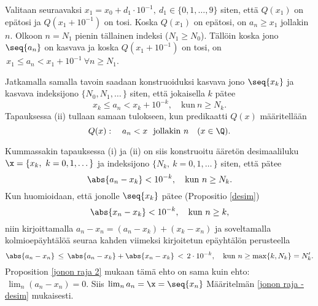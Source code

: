 Valitaan seuraavaksi $x_1 = x_0 + d_1 \cdot 10^{-1},\ d_1 \in \{0,1, \ldots, 9\}$ siten, että
$Q(x_1)$ on epätosi ja $Q(x_1 + 10^{-1})$ on tosi. Koska $Q(x_1)$ on epätosi, on $a_n \ge x_1$
jollakin $n$. Olkoon $n=N_1$ pienin tällainen indeksi ($N_1 \ge N_0$). Tällöin koska jono 
$\seq{a_n}$ on kasvava ja koska $Q(x_1 + 10^{-1})$ on tosi, on 
$\,x_1 \le a_n < x_1 + 10^{-1}\ \forall n \ge N_1$.

Jatkamalla samalla tavoin saadaan konstruoiduksi kasvava jono $\seq{x_k}$ ja kasvava indeksijono
$\{N_0,N_1, \ldots\,\}$ siten, että jokaisella $k$ pätee
\begin{equation}  \label{suppenemisehto - desim}
x_k \le a_n < x_k + 10^{-k}, \quad \text{kun}\ n \ge N_k. \tag{$\star$}
\end{equation}
Tapauksessa (ii) tullaan samaan tulokseen, kun predikaatti $Q(x)$ määritellään
\[
Q(x): \quad a_n < x \ \ \text{jollakin}\ n \quad (x \in \Q).
\]

Kummassakin tapauksessa (i) ja (ii) on siis konstruoitu ääretön desimaaliluku 
$\x=\{x_k,\ k=0,1,\ldots\,\}$ ja indeksijono $\{N_k,\ k=0,1,\ldots\,\}$ siten, että pätee
\[
\abs{a_n-x_k} < 10^{-k}, \quad \text{kun}\ n \ge N_k.
\]
Kun huomioidaan, että jonolle $\seq{x_k}$ pätee (Propositio \ref{desim})
\[
\abs{x_n-x_k} < 10^{-k}, \quad \text{kun}\ n \ge k,
\]
niin kirjoittamalla $a_n-x_n = (a_n-x_k)+(x_k-x_n)$ ja soveltamalla kolmioepäyhtälöä seuraa
kahden viimeksi kirjoitetun epäyhtälön perusteella
\[
\abs{a_n-x_n} \,\le\, \abs{a_n-x_k}+\abs{x_n-x_k} \,<\, 2 \cdot 10^{-k}, \quad
                \text{kun}\ n \ge \max\{k,N_k\} = N_k'.
\]
Proposition \ref{jonon raja 2} mukaan tämä ehto on sama kuin ehto: $\,\lim_n(a_n-x_n)=0$. Siis
$\lim_n a_n = \x = \seq{x_n}$ Määritelmän \ref{jonon raja - desim} mukaisesti. \loppu

